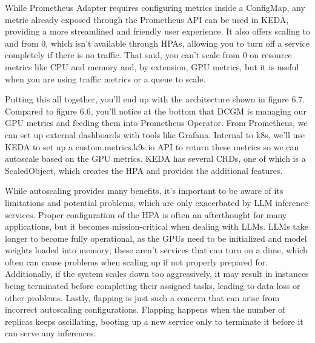 While Prometheus Adapter requires configuring metrics inside a ConfigMap, any metric already exposed through the Prometheus API can be used in KEDA, providing a more streamlined and friendly user experience. It also offers scaling to and from 0, which isn't available through HPAs, allowing you to turn off a service completely if there is no traffic. That said, you can't scale from 0 on resource metrics like CPU and memory and, by extension, GPU metrics, but it is useful when you are using traffic metrics or a queue to scale.

Putting this all together, you'll end up with the architecture shown in figure 6.7. Compared to figure 6.6, you'll notice at the bottom that DCGM is managing our GPU metrics and feeding them into Prometheus Operator. From Prometheus, we can set up external dashboards with tools like Grafana. Internal to k8s, we'll use KEDA to set up a custom.metrics.k9s.io API to return these metrics so we can autoscale based on the GPU metrics. KEDA has several CRDs, one of which is a ScaledObject, which creates the HPA and provides the additional features.

While autoscaling provides many benefits, it's important to be aware of its limitations and potential problems, which are only exacerbated by LLM inference services. Proper configuration of the HPA is often an afterthought for many applications, but it becomes mission-critical when dealing with LLMs. LLMs take longer to become fully operational, as the GPUs need to be initialized and model weights loaded into memory; these aren't services that can turn on a dime, which often can cause problems when scaling up if not properly prepared for. Additionally, if the system scales down too aggressively, it may result in instances being terminated before completing their assigned tasks, leading to data loss or other problems. Lastly, flapping is just such a concern that can arise from incorrect autoscaling configurations. Flapping happens when the number of replicas keeps oscillating, booting up a new service only to terminate it before it can serve any inferences.

